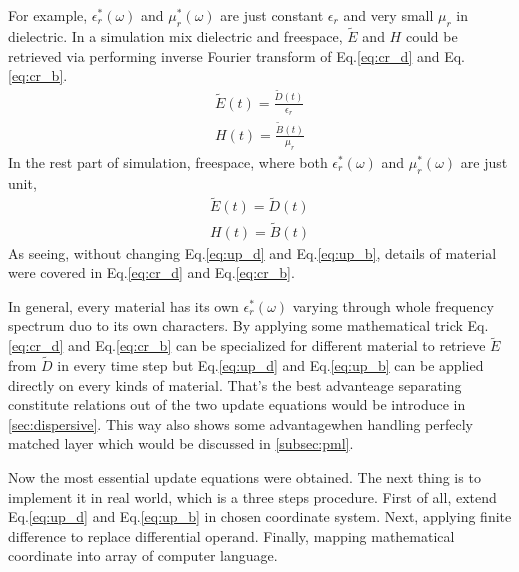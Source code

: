 For example, $\epsilon_r^*(\omega)$ and $\mu_r^*(\omega)$ are just constant $\epsilon_r$ and very small $\mu_r$ in
dielectric. In a simulation mix dielectric and freespace, $\widetilde{E}$ and $H$ could be retrieved via performing
inverse Fourier transform of Eq.\ref{eq:cr_d} and Eq.\ref{eq:cr_b}.
\begin{gather*}
  \widetilde{E}(t) = \frac{\widetilde{D}(t)}{\epsilon_r}\\
  H(t) = \frac{\widetilde{B}(t)}{\mu_r}
\end{gather*}
In the rest part of simulation, freespace, where both $\epsilon_r^*(\omega)$ and $\mu_r^*(\omega)$ are just unit, 
\begin{gather*}
  \widetilde{E}(t) = \widetilde{D}(t)\\
  H(t) = \widetilde{B}(t)
\end{gather*}
As seeing, without changing Eq.\ref{eq:up_d} and Eq.\ref{eq:up_b}, details of material were covered in Eq.\ref{eq:cr_d}
and Eq.\ref{eq:cr_b}.

In general, every material has its own $\epsilon_r^*(\omega)$ varying through whole frequency spectrum duo to its own
characters. By applying some mathematical trick Eq.\ref{eq:cr_d} and Eq.\ref{eq:cr_b} can be specialized for different
material to retrieve $\widetilde{E}$ from $\widetilde{D}$ in every time step but Eq.\ref{eq:up_d} and Eq.\ref{eq:up_b}
can be applied directly on every kinds of material. That's the best advanteage separating constitute relations out of
the two update equations would be introduce in \ref{sec:dispersive}. This way also shows some advantagewhen handling
perfecly matched layer which would be discussed in \ref{subsec:pml}.

Now the most essential update equations were obtained. The next thing is to implement it in real world, which is a three
steps procedure. First of all, extend Eq.\ref{eq:up_d} and Eq.\ref{eq:up_b} in chosen coordinate system. Next, applying
finite difference to replace differential operand. Finally, mapping mathematical coordinate into array of computer
language.

